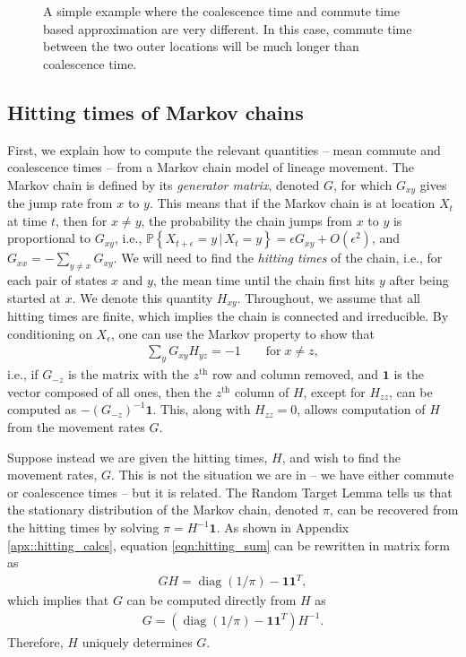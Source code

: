 \documentclass{article}
\DeclareMathOperator{\diag}{\mathop{\mbox{diag}}}
\renewcommand{\P}{\mathbb{P}}
\newcommand{\given}{\,\vert\,}
\newcommand{\PP}[1]{\P\!\left\{#1\right\}}
\newcommand{\bone}{\mathbf{1}}
\begin{document}
\begin{figure}
\centering
\caption{A simple example where the coalescence time and commute time based approximation
are very different.
In this case, commute time between the two outer locations will be much longer 
than coalescence time.}
\label{fig:3_state}
\end{figure}


\subsection*{Hitting times of Markov chains}

First, we explain how to compute the relevant quantities --
mean commute and coalescence times -- from a Markov chain model of lineage movement.
The Markov chain is defined by its \emph{generator matrix}, denoted $G$,
for which $G_{xy}$ gives the jump rate from $x$ to $y$.
This means that if the Markov chain is at location $X_t$ at time $t$,
then for $x \neq y$, the probability the chain jumps from $x$ to $y$ is proportional to $G_{xy}$,
i.e., $\PP{X_{t+\epsilon} = y \given X_t = y} = \epsilon G_{xy} + O(\epsilon^2)$,
and $G_{xx} = - \sum_{y \neq x} G_{xy}$.
We will need to find the \emph{hitting times} of the chain,
i.e., for each pair of states $x$ and $y$, 
the mean time until the chain first hits $y$ after being started at $x$.
We denote this quantity $H_{xy}$.
Throughout, we assume that all hitting times are finite,
which implies the chain is connected and irreducible.
By conditioning on $X_\epsilon$,
one can use the Markov property to show that
\begin{align} \label{eqn:hitting_sum}
    \sum_y G_{xy} H_{yz} = -1 \qquad \text{for} \; x \neq z,
\end{align}
i.e., if $G_{-z}$ is the matrix with the $z^\text{th}$ row and column removed,
and $\bone$ is the vector composed of all ones,
then the $z^\text{th}$ column of $H$, except for $H_{zz}$,
can be computed as $- (G_{-z})^{-1} \bone$.
This, along with $H_{zz} = 0$, allows computation of $H$
from the movement rates $G$.

Suppose instead we are given the hitting times, $H$, and wish to find the movement rates, $G$.
This is not the situation we are in -- we have either commute or coalescence times --
but it is related.
The Random Target Lemma \citep{aldous}
tells us that the stationary distribution of the Markov chain, denoted $\pi$,
can be recovered from the hitting times by solving $\pi = H^{-1} \bone$.
As shown in Appendix \ref{apx::hitting_calcs},
equation \eqref{eqn:hitting_sum} can be rewritten in matrix form as
\begin{align}
    G H = \diag(1/\pi) - \bone \bone^T ,
\end{align}
which implies that $G$ can be computed directly from $H$ as
\begin{align} \label{eqn:G_from_H}
    G = \left( \diag(1/\pi) - \bone \bone^T \right) H^{-1} .
\end{align}
Therefore, $H$ uniquely determines $G$.
\end{document}
